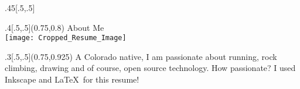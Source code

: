 \documentclass{article}
\begin{document}
\begin{titlepage}
\begin{center}
\begin{textblock}{.45}[.5,.5]
	\end{textblock}
	
	
	


	\begin{textblock}{.4}[.5,.5](0.75,0.8)
		{\fontsize{16}{18}\headerfont About Me \\}
		\bigskip
		\texttt{[image: Cropped\_Resume\_Image]}

	\end{textblock}
	\begin{textblock}{.3}[.5,.5](0.75,0.925)
		{\fontsize{12}{14}\bodyfont A Colorado native, I am passionate about running, rock climbing, drawing and of course, open source technology. How passionate? I used Inkscape and \LaTeX\  for this resume! }
	\end{textblock}
	


 \end{center}
 \end{titlepage}
 
\end{document}
